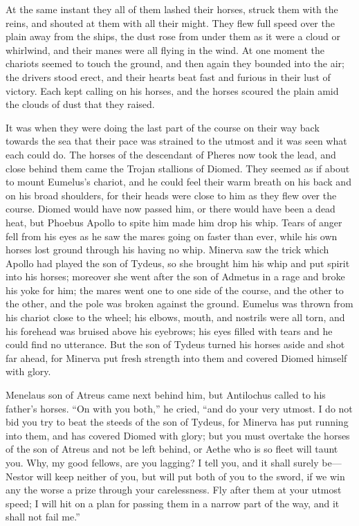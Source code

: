 At the same instant they all of them lashed their horses, struck them with
the reins, and shouted at them with all their might. They flew full speed
over the plain away from the ships, the dust rose from under them as it
were a cloud or whirlwind, and their manes were all flying in the wind. At
one moment the chariots seemed to touch the ground, and then again they
bounded into the air; the drivers stood erect, and their hearts beat fast
and furious in their lust of victory. Each kept calling on his horses, and
the horses scoured the plain amid the clouds of dust that they raised.

It was when they were doing the last part of the course on their way back
towards the sea that their pace was strained to the utmost and it was seen
what each could do. The horses of the descendant of Pheres now took the
lead, and close behind them came the Trojan stallions of Diomed. They
seemed as if about to mount Eumelus’s chariot, and he could feel their
warm breath on his back and on his broad shoulders, for their heads were
close to him as they flew over the course. Diomed would have now passed
him, or there would have been a dead heat, but Phoebus Apollo to spite him
made him drop his whip. Tears of anger fell from his eyes as he saw the
mares going on faster than ever, while his own horses lost ground through
his having no whip. Minerva saw the trick which Apollo had played the son
of Tydeus, so she brought him his whip and put spirit into his horses;
moreover she went after the son of Admetus in a rage and broke his yoke
for him; the mares went one to one side of the course, and the other to
the other, and the pole was broken against the ground. Eumelus was thrown
from his chariot close to the wheel; his elbows, mouth, and nostrils were
all torn, and his forehead was bruised above his eyebrows; his eyes filled
with tears and he could find no utterance. But the son of Tydeus turned
his horses aside and shot far ahead, for Minerva put fresh strength into
them and covered Diomed himself with glory.

Menelaus son of Atreus came next behind him, but Antilochus called to his
father’s horses. “On with you both,” he cried, “and do your very utmost. I
do not bid you try to beat the steeds of the son of Tydeus, for Minerva
has put running into them, and has covered Diomed with glory; but you must
overtake the horses of the son of Atreus and not be left behind, or Aethe
who is so fleet will taunt you. Why, my good fellows, are you lagging? I
tell you, and it shall surely be—Nestor will keep neither of you,
but will put both of you to the sword, if we win any the worse a prize
through your carelessness. Fly after them at your utmost speed; I will hit
on a plan for passing them in a narrow part of the way, and it shall not
fail me.”

